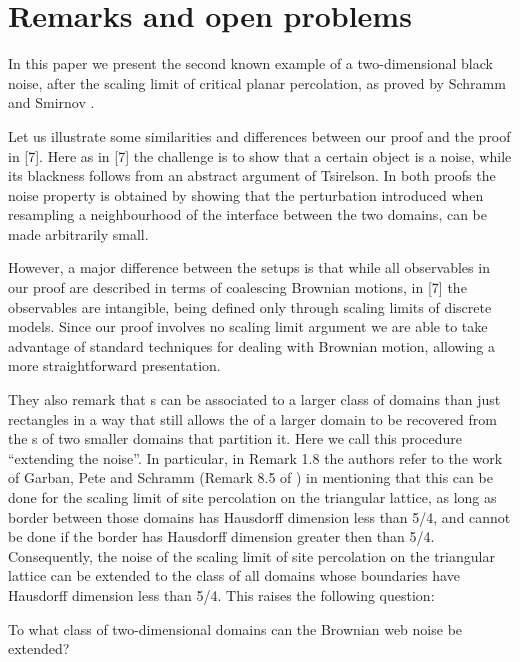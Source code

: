 {
\section{Remarks and open problems}

\label{sec:open-problems}

In this paper we present the second known example of a two-dimensional
black noise, after the scaling limit of critical planar percolation,
as proved by Schramm and Smirnov \cite{schramm-smirnov}.

Let us illustrate some similarities and differences between our proof
and the proof in [7]. Here as in [7] the challenge is to show that a
certain object is a noise, while its blackness follows from an
abstract argument of Tsirelson. In both proofs the noise property is
obtained by showing that the perturbation introduced when resampling a
neighbourhood of the interface between the two domains, can be made
arbitrarily small.

However, a major difference between the setups is that while all
observables in our proof are described in terms of coalescing Brownian
motions, in [7] the observables are intangible, being defined only
through scaling limits of discrete models. Since our proof involves no
scaling limit argument we are able to take advantage of standard
techniques for dealing with Brownian motion, allowing a more
straightforward presentation.


They also remark
that \sigfield{}s can be associated to a larger class of domains than
just rectangles in a way that still allows the \sigfield{} of a larger
domain to be recovered from the \sigfield{}s of two smaller domains
that partition it.
Here we call this procedure ``extending the noise''.
In particular, in Remark 1.8 the authors refer to the work of Garban,
Pete and Schramm (Remark 8.5 of \cite{garban-pete-schramm}) in
mentioning that this can be done for the
scaling limit of site percolation on the triangular lattice, as long
as border between those domains has Hausdorff dimension less
than 5/4, and cannot be done if the border has Hausdorff dimension
greater then than 5/4.
Consequently, the noise of the scaling limit of site percolation on
the triangular lattice can be extended to the class of all domains
whose boundaries have Hausdorff dimension less than 5/4.
This raises the following question:

\begin{openproblem}
  \label{openproblem:extend}
  To what class of two-dimensional domains can the Brownian web noise be extended?
\end{openproblem}

}

